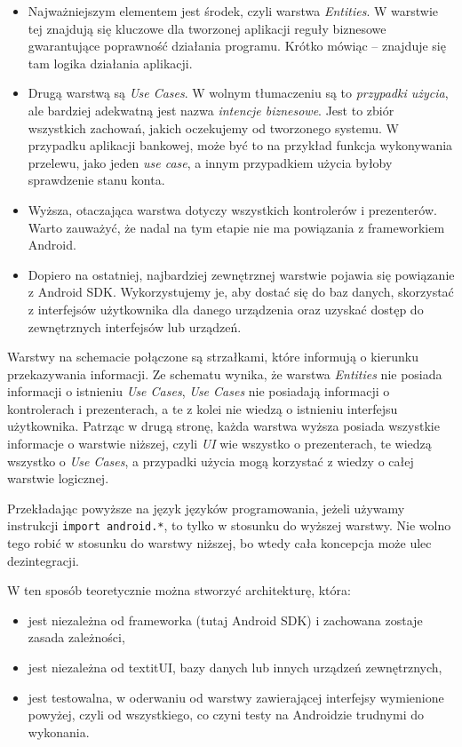 \begin{itemize}

\item
Najważniejszym elementem jest środek, czyli warstwa \textit{Entities}. W warstwie tej znajdują się kluczowe dla tworzonej aplikacji reguły biznesowe gwarantujące poprawność działania programu. Krótko mówiąc – znajduje się tam logika działania aplikacji.
\item
Drugą warstwą są \textit{Use Cases}. W wolnym tłumaczeniu są to \textit{przypadki użycia}, ale bardziej adekwatną jest nazwa \textit{intencje biznesowe}. Jest to zbiór wszystkich zachowań, jakich oczekujemy od tworzonego systemu. W przypadku aplikacji bankowej, może być to na przykład funkcja wykonywania przelewu, jako jeden \textit{use case}, a innym przypadkiem użycia byłoby sprawdzenie stanu konta.
\item
Wyższa, otaczająca warstwa dotyczy wszystkich kontrolerów i prezenterów. Warto zauważyć, że nadal na tym etapie nie ma powiązania z frameworkiem Android.
\item
Dopiero na ostatniej, najbardziej zewnętrznej warstwie pojawia się powiązanie z Android SDK. Wykorzystujemy je, aby dostać się do baz danych, skorzystać z interfejsów użytkownika dla danego urządzenia oraz uzyskać dostęp do zewnętrznych interfejsów lub urządzeń.
\end{itemize}

Warstwy na schemacie połączone są strzałkami, które informują o kierunku przekazywania informacji. Ze schematu wynika, że warstwa \textit{Entities} nie posiada informacji o istnieniu \textit{Use Cases}, \textit{Use Cases} nie posiadają informacji o kontrolerach i prezenterach, a te z kolei nie wiedzą o istnieniu interfejsu użytkownika. Patrząc w drugą stronę, każda warstwa wyższa posiada wszystkie informacje o warstwie niższej, czyli \textit{UI} wie wszystko o prezenterach, te wiedzą wszystko o \textit{Use Cases}, a przypadki użycia mogą korzystać z wiedzy o całej warstwie logicznej.

Przekładając powyższe na język języków programowania, jeżeli używamy instrukcji \texttt{import android.*}, to tylko w stosunku do wyższej warstwy. Nie wolno tego robić w stosunku do warstwy niższej, bo wtedy cała koncepcja może ulec dezintegracji.

W ten sposób teoretycznie można stworzyć architekturę, która:
\begin{itemize}
\item
jest niezależna od frameworka (tutaj Android SDK) i zachowana zostaje zasada zależności,
\item
jest niezależna od textit{UI}, bazy danych lub innych urządzeń zewnętrznych,
\item
jest testowalna, w oderwaniu od warstwy zawierającej interfejsy wymienione powyżej, czyli od wszystkiego, co czyni testy na Androidzie trudnymi do wykonania.
\end{itemize}

